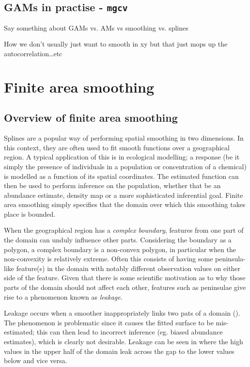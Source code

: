 \subsection{GAMs in practise - \texttt{mgcv}}


Say something about GAMs vs. AMs vs smoothing vs. splines

How we don't usually just want to smooth in xy but that just mops up the autocorrelation\ldots etc


\section{Finite area smoothing}

\subsection{Overview of finite area smoothing}
\label{intro-FAS}

Splines are a popular way of performing spatial smoothing in two dimensions. In this context, they are often used to fit smooth functions over a geographical region. A typical application of this is in ecological modelling; a response (be it simply the presence of individuals in a population or concentration of a chemical) is modelled as a function of its spatial coordinates. The estimated function can then be used to perform inference on the population, whether that be an abundance estimate, density map or a more sophisticated inferential goal. Finite area smoothing simply specifies that the domain over which this smoothing takes place is bounded.

When the geographical region has a \emph{complex boundary}, features from one part of the domain can unduly influence other parts. Considering the boundary as a polygon, a complex boundary is a non-convex polygon, in particular when the non-convexity is relatively extreme. Often this consists of having some peninsula-like feature(s) in the domain with notably different observation values on either side of the feature. Given that there is some scientific motivation as to why those parts of the domain should not affect each other, features such as peninsulae give rise to a phenomenon known as \emph{leakage}.

Leakage occurs when a smoother inappropriately links two pats of a domain (\cite{soap}). The phenomenon is problematic since it causes the fitted surface to be mis-estimated; this can then lead to incorrect inference (eg. biased abundance estimates), which is clearly not desirable. Leakage can be seen in  where the high values in the upper half of the domain leak across the gap to the lower values below and vice versa.

